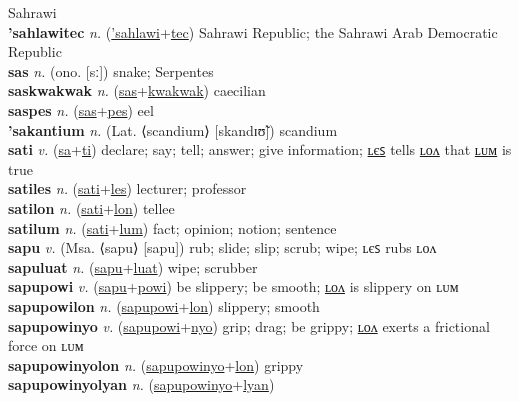 Sahrawi \label{'sahlawiak} \\
\textbf{'sahlawitec} \textit{n.} (\hyperref['sahlawi]{'sahlawi}+\hyperref[tec]{tec})
Sahrawi Republic; the Sahrawi Arab Democratic Republic \label{'sahlawitec} \\
\textbf{sas} \textit{n.} (ono. [sː])
snake; Serpentes \label{sas} \\
\textbf{saskwakwak} \textit{n.} (\hyperref[sas]{sas}+\hyperref[kwakwak]{kwakwak})
caecilian \label{saskwakwak} \\
\textbf{saspes} \textit{n.} (\hyperref[sas]{sas}+\hyperref[pes]{pes})
eel \label{saspes} \\
\textbf{'sakantium} \textit{n.} (Lat. ⟨scandium⟩ [skandɪʊ̃])
scandium \label{'sakantium} \\
\textbf{sati} \textit{v.} (\hyperref[sa]{sa}+\hyperref[ti]{ti})
declare; say; tell; answer; give information; \hyperref[satiles]{ʟєꜱ} tells \hyperref[satilon]{ʟᴏᴧ} that \hyperref[satilum]{ʟᴜᴍ} is true \label{sati} \\
\textbf{satiles} \textit{n.} (\hyperref[sati]{sati}+\hyperref[les]{les})
lecturer; professor \label{satiles} \\
\textbf{satilon} \textit{n.} (\hyperref[sati]{sati}+\hyperref[lon]{lon})
tellee \label{satilon} \\
\textbf{satilum} \textit{n.} (\hyperref[sati]{sati}+\hyperref[lum]{lum})
fact; opinion; notion; sentence \label{satilum} \\
\textbf{sapu} \textit{v.} (Msa. ⟨sapu⟩ [sapu])
rub; slide; slip; scrub; wipe; ʟєꜱ rubs ʟᴏᴧ \label{sapu} \\
\textbf{sapuluat} \textit{n.} (\hyperref[sapu]{sapu}+\hyperref[luat]{luat})
wipe; scrubber \label{sapuluat} \\
\textbf{sapupowi} \textit{v.} (\hyperref[sapu]{sapu}+\hyperref[powi]{powi})
be slippery; be smooth; \hyperref[sapupowilon]{ʟᴏᴧ} is slippery on ʟᴜᴍ \label{sapupowi} \\
\textbf{sapupowilon} \textit{n.} (\hyperref[sapupowi]{sapupowi}+\hyperref[lon]{lon})
slippery; smooth \label{sapupowilon} \\
\textbf{sapupowinyo} \textit{v.} (\hyperref[sapupowi]{sapupowi}+\hyperref[nyo]{nyo})
grip; drag; be grippy; \hyperref[sapupowinyolon]{ʟᴏᴧ} exerts a frictional force on ʟᴜᴍ \label{sapupowinyo} \\
\textbf{sapupowinyolon} \textit{n.} (\hyperref[sapupowinyo]{sapupowinyo}+\hyperref[lon]{lon})
grippy \label{sapupowinyolon} \\
\textbf{sapupowinyolyan} \textit{n.} (\hyperref[sapupowinyo]{sapupowinyo}+\hyperref[lyan]{lyan})
